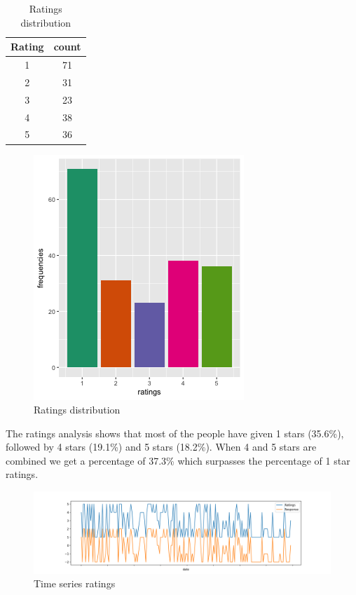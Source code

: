 \documentclass[a4paper, 12pt]{extarticle}
\begin{document}
{\begin{table}[H]
\centering
\begin{tabular}{|c|c|}
\hline
Rating & count \\
\hline
1 & 71 \\
\hline
2 & 31 \\
\hline
3 & 23 \\
\hline
4 & 38 \\
\hline
5 & 36 \\
\hline
\end{tabular}
\caption{Ratings distribution}
\end{table}
\begin{figure}[H]
\centering
\includegraphics[scale=1]{ratings_distribution.png}
\caption{Ratings distribution}
\end{figure}

The ratings analysis shows that most of the people have given 1 stars (35.6\%), followed by 4 stars (19.1\%) and 5 stars (18.2\%). When 4 and 5 stars are combined we get a percentage of 37.3\% which surpasses the percentage of 1 star ratings. 
\begin{figure}[H]
\centering
\includegraphics[scale=0.5]{rat_res.png}
\caption{Time series ratings}
\label{fig:rat_res}
\end{figure}

}
\end{document}
